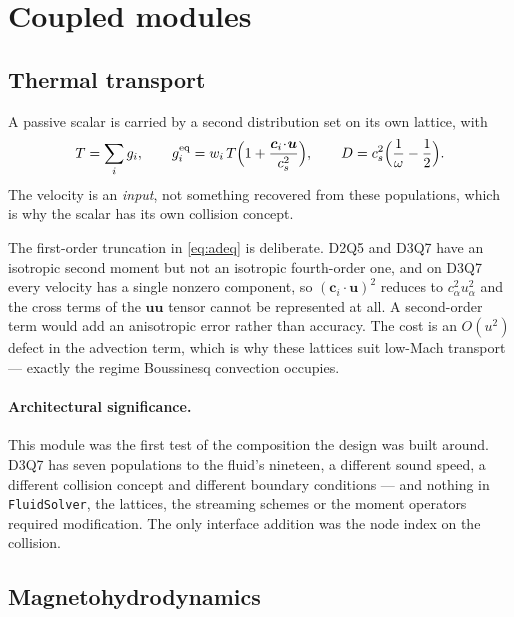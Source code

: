 \documentclass[11pt,a4paper]{article}
\newcommand{\code}[1]{\texttt{\small #1}}
\newcommand{\cs}{c_s}
\newcommand{\ci}{\bm{c}_i}
\newcommand{\uu}{\bm{u}}
\begin{document}
\section{Coupled modules}

\subsection{Thermal transport}

A passive scalar is carried by a second distribution set on its own lattice, with
\begin{equation}
  T = \sum_i g_i, \qquad
  g_i^{\rm eq} = w_i\,T\Big(1 + \frac{\ci\!\cdot\!\uu}{\cs^2}\Big), \qquad
  D = \cs^2\Big(\frac{1}{\omega}-\frac12\Big).
  \label{eq:adeq}
\end{equation}
The velocity is an \emph{input}, not something recovered from these populations,
which is why the scalar has its own collision concept.

The first-order truncation in \eqref{eq:adeq} is deliberate. D2Q5 and D3Q7 have an
isotropic second moment but not an isotropic fourth-order one, and on D3Q7 every
velocity has a single nonzero component, so $(\ci\!\cdot\!\uu)^2$ reduces to
$c_\alpha^2u_\alpha^2$ and the cross terms of the $\uu\uu$ tensor cannot be
represented at all. A second-order term would add an anisotropic error rather
than accuracy. The cost is an $O(u^2)$ defect in the advection term, which is why
these lattices suit low-Mach transport --- exactly the regime Boussinesq
convection occupies.

\paragraph{Architectural significance.} This module was the first test of the
composition the design was built around. D3Q7 has seven populations to the
fluid's nineteen, a different sound speed, a different collision concept and
different boundary conditions --- and nothing in \code{FluidSolver}, the lattices,
the streaming schemes or the moment operators required modification. The only
interface addition was the node index on the collision.

\subsection{Magnetohydrodynamics}
\end{document}
